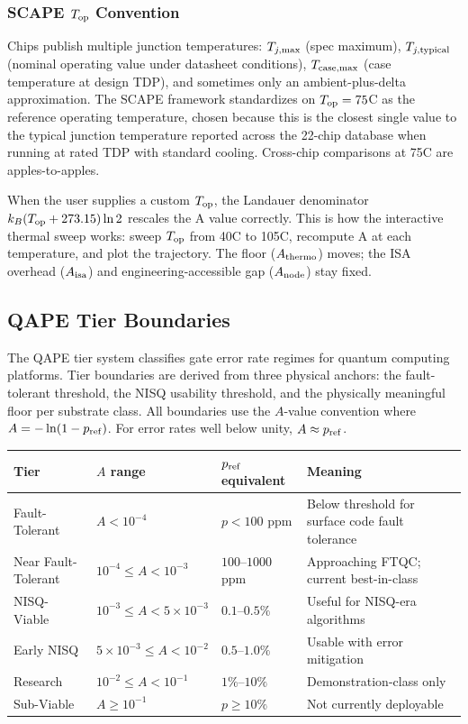 \documentclass[12pt,a4paper]{article}
\begin{document}
\subsubsection{SCAPE $T_{\rm op}$ Convention}
\label{subsec:scape_top}

Chips publish multiple junction temperatures: $T_{j,\rm max}$ (spec maximum),
$T_{j,\rm typical}$ (nominal operating value under datasheet conditions),
$T_{\rm case,\rm max}$ (case temperature at design TDP), and sometimes only
an ambient-plus-delta approximation. The SCAPE framework standardizes on
$T_{\rm op} = 75$\textdegree C as the reference operating temperature,
chosen because this is the closest single value to the typical junction
temperature reported across the 22-chip database when running at rated TDP
with standard cooling. Cross-chip comparisons at 75\textdegree C are
apples-to-apples.

When the user supplies a custom $T_{\rm op}$, the Landauer denominator
$k_B(T_{\rm op}+273.15)\ln 2$ rescales the A value correctly. This is how
the interactive thermal sweep works: sweep $T_{\rm op}$ from 40\textdegree C
to 105\textdegree C, recompute A at each temperature, and plot the
trajectory. The floor ($A_{\rm thermo}$) moves; the ISA overhead
($A_{\rm isa}$) and engineering-accessible gap ($A_{\rm node}$) stay fixed.

\subsection{QAPE Tier Boundaries}
\label{subsec:qape_tiers}

The QAPE tier system classifies gate error rate regimes for quantum computing
platforms. Tier boundaries are derived from three physical anchors: the
fault-tolerant threshold, the NISQ usability threshold, and the physically
meaningful floor per substrate class. All boundaries use the $A$-value
convention where $A = -\ln(1 - p_{\rm ref})$. For error rates well below
unity, $A \approx p_{\rm ref}$.

\begin{center}
\begin{tabular}{llll}
\toprule
\textbf{Tier} & \textbf{$A$ range} & \textbf{$p_{\rm ref}$ equivalent} & \textbf{Meaning} \\
\midrule
Fault-Tolerant & $A < 10^{-4}$ & $p < 100$ ppm & Below threshold for surface code fault tolerance \\
Near Fault-Tolerant & $10^{-4} \le A < 10^{-3}$ & $100$--$1000$ ppm & Approaching FTQC; current best-in-class \\
NISQ-Viable & $10^{-3} \le A < 5 \times 10^{-3}$ & $0.1$--$0.5\%$ & Useful for NISQ-era algorithms \\
Early NISQ & $5 \times 10^{-3} \le A < 10^{-2}$ & $0.5$--$1.0\%$ & Usable with error mitigation \\
Research & $10^{-2} \le A < 10^{-1}$ & $1\%$--$10\%$ & Demonstration-class only \\
Sub-Viable & $A \ge 10^{-1}$ & $p \ge 10\%$ & Not currently deployable \\
\bottomrule
\end{tabular}
\end{center}
\end{document}
